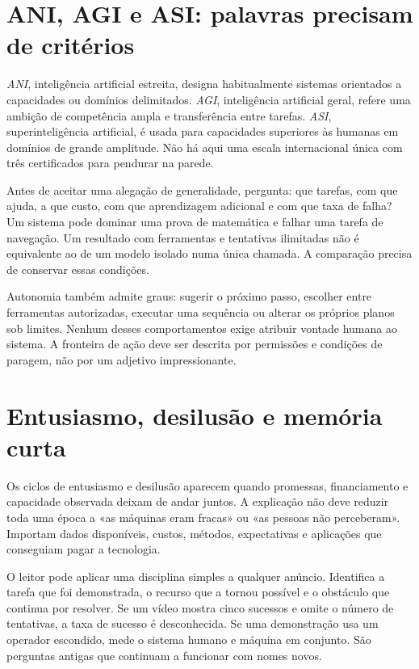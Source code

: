 \section{ANI, AGI e ASI: palavras precisam de critérios}
\emph{ANI}, inteligência artificial estreita, designa habitualmente sistemas orientados a capacidades ou domínios delimitados. \emph{AGI}, inteligência artificial geral, refere uma ambição de competência ampla e transferência entre tarefas. \emph{ASI}, superinteligência artificial, é usada para capacidades superiores às humanas em domínios de grande amplitude. Não há aqui uma escala internacional única com três certificados para pendurar na parede.

Antes de aceitar uma alegação de generalidade, pergunta: que tarefas, com que ajuda, a que custo, com que aprendizagem adicional e com que taxa de falha? Um sistema pode dominar uma prova de matemática e falhar uma tarefa de navegação. Um resultado com ferramentas e tentativas ilimitadas não é equivalente ao de um modelo isolado numa única chamada. A comparação precisa de conservar essas condições.

Autonomia também admite graus: sugerir o próximo passo, escolher entre ferramentas autorizadas, executar uma sequência ou alterar os próprios planos sob limites. Nenhum desses comportamentos exige atribuir vontade humana ao sistema. A fronteira de ação deve ser descrita por permissões e condições de paragem, não por um adjetivo impressionante.

\section{Entusiasmo, desilusão e memória curta}
Os ciclos de entusiasmo e desilusão aparecem quando promessas, financiamento e capacidade observada deixam de andar juntos. A explicação não deve reduzir toda uma época a «as máquinas eram fracas» ou «as pessoas não perceberam». Importam dados disponíveis, custos, métodos, expectativas e aplicações que conseguiam pagar a tecnologia.

O leitor pode aplicar uma disciplina simples a qualquer anúncio. Identifica a tarefa que foi demonstrada, o recurso que a tornou possível e o obstáculo que continua por resolver. Se um vídeo mostra cinco sucessos e omite o número de tentativas, a taxa de sucesso é desconhecida. Se uma demonstração usa um operador escondido, mede o sistema humano e máquina em conjunto. São perguntas antigas que continuam a funcionar com nomes novos.


